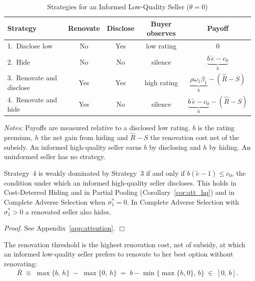 \documentclass[10pt,letterpaper]{bp-template-concise}
\begin{document}
\begin{table}[htbp]
\centering
\caption{Strategies for an Informed Low-Quality Seller ($\theta=0$)}
\label{tab:strategies}
\small
\renewcommand{\arraystretch}{2.1}
\begin{tabular*}{\textwidth}{@{\extracolsep{\fill}}lcccc@{}}
\toprule\toprule
\textbf{Strategy} & \textbf{Renovate} & \textbf{Disclose} & \textbf{Buyer observes} & \textbf{Payoff} \\
\midrule
1.\ Disclose low & No & Yes & low rating & $0$ \\
2.\ Hide & No & No & silence & $\underbrace{b\,\tilde e-c_0}_{h}$ \\
3.\ Renovate and disclose & Yes & Yes & high rating & $\underbrace{\rho\omega_1\beta_1}_{b}-(\hat R-S)$ \\
4.\ Renovate and hide & Yes & No & silence & $\underbrace{b\,\tilde e-c_0}_{h}-(\hat R-S)$ \\
\bottomrule\bottomrule
\end{tabular*}
\vspace{0.5em}

\raggedright
\footnotesize
\textit{Notes:} Payoffs are measured relative to a disclosed low rating. $b$ is the rating premium, $h$ the net gain from hiding and $\hat R-S$ the renovation cost net of the subsidy. An informed high-quality seller earns $b$ by disclosing and $h$ by hiding. An uninformed seller has no strategy.
\end{table}

\begin{lemma}
\label{lem:renov_behaviour}
Strategy~4 is weakly dominated by Strategy~3 if and only if $b(\tilde e-1)\le c_0$, the condition under which an informed high-quality seller discloses. This holds in Cost-Deterred Hiding and in Partial Pooling (Corollary~\ref{cor:att_hq}) and in Complete Adverse Selection when $\sigma_1^*=0$. In Complete Adverse Selection with $\sigma_1^*>0$ a renovated seller also hides.
\end{lemma}

\noindent\textit{Proof.} See Appendix~\ref{app:attention}. $\Box$

\begin{definition}
\label{def:threshold}
The renovation threshold is the highest renovation cost, net of subsidy, at which an informed low-quality seller prefers to renovate to her best option without renovating:
\begin{equation}
    \bar{R}\;\equiv\;\max\{b,\,h\}\;-\;\max\{0,\,h\}\;=\;b-\min\big\{\max\{h,0\},\,b\big\}\;\in\;[0,\,b].
    \label{eq:threshold}
\end{equation}
\end{definition}
\end{document}
